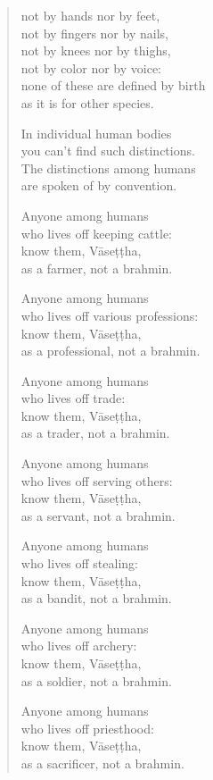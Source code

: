 \documentclass[12pt,openany]{book}%
\begin{document}
\begin{verse}
not by hands nor by feet, \\
not by fingers nor by nails, \\
not by knees nor by thighs, \\
not by color nor by voice: \\
none of these are defined by birth \\
as it is for other species. 

In individual human bodies \\
you can’t find such distinctions. \\
The distinctions among humans \\
are spoken of by convention. 

Anyone among humans \\
who lives off keeping cattle: \\
know them, \textsanskrit{Vāseṭṭha}, \\
as a farmer, not a brahmin. 

Anyone among humans \\
who lives off various professions: \\
know them, \textsanskrit{Vāseṭṭha}, \\
as a professional, not a brahmin. 

Anyone among humans \\
who lives off trade: \\
know them, \textsanskrit{Vāseṭṭha}, \\
as a trader, not a brahmin. 

Anyone among humans \\
who lives off serving others: \\
know them, \textsanskrit{Vāseṭṭha}, \\
as a servant, not a brahmin. 

Anyone among humans \\
who lives off stealing: \\
know them, \textsanskrit{Vāseṭṭha}, \\
as a bandit, not a brahmin. 

Anyone among humans \\
who lives off archery: \\
know them, \textsanskrit{Vāseṭṭha}, \\
as a soldier, not a brahmin. 

Anyone among humans \\
who lives off priesthood: \\
know them, \textsanskrit{Vāseṭṭha}, \\
as a sacrificer, not a brahmin. 


\end{verse}
\end{document}
